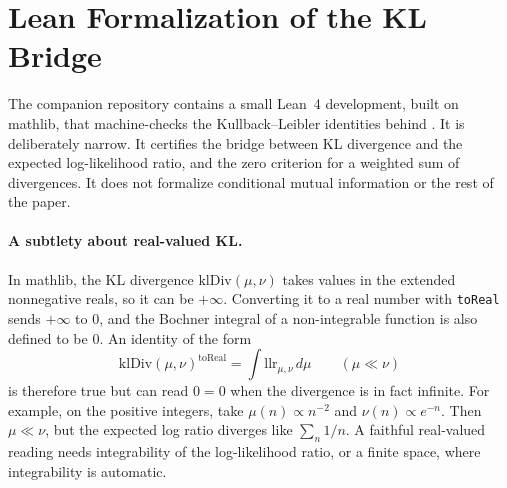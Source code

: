 \section{Lean Formalization of the KL Bridge}\label{app:lean}

The companion repository contains a small Lean~4 development, built on mathlib, that machine-checks the Kullback--Leibler identities behind  \citep{demoura2015leantheoremprover,mathlib2020leanmathematicallibrary}. It is deliberately narrow. It certifies the bridge between KL divergence and the expected log-likelihood ratio, and the zero criterion for a weighted sum of divergences. It does not formalize conditional mutual information or the rest of the paper.

\paragraph{A subtlety about real-valued KL.} In mathlib, the KL divergence $\mathrm{klDiv}(\mu,\nu)$ takes values in the extended nonnegative reals, so it can be $+\infty$. Converting it to a real number with \texttt{toReal} sends $+\infty$ to $0$, and the Bochner integral of a non-integrable function is also defined to be $0$. An identity of the form
\[
\mathrm{klDiv}(\mu,\nu)^{\mathrm{toReal}}=\int \mathrm{llr}_{\mu,\nu}\,d\mu
\qquad(\mu\ll\nu)
\]
is therefore true but can read $0=0$ when the divergence is in fact infinite. For example, on the positive integers, take $\mu(n)\propto n^{-2}$ and $\nu(n)\propto e^{-n}$. Then $\mu\ll\nu$, but the expected log ratio diverges like $\sum_n 1/n$. A faithful real-valued reading needs integrability of the log-likelihood ratio, or a finite space, where integrability is automatic.

